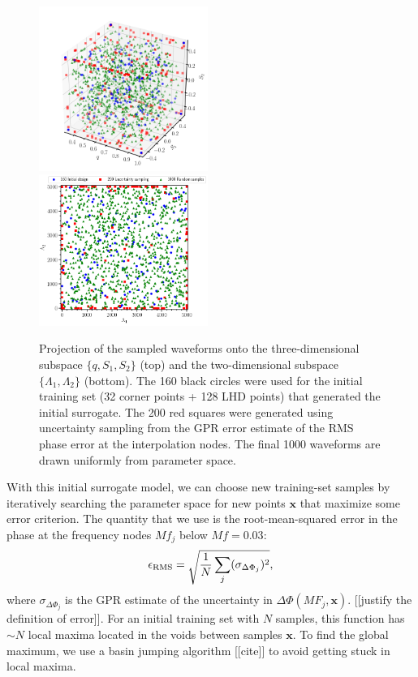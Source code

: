 \documentclass[prd,aps,letter,twocolumn,floatfix,notitlepage,nofootinbib]{revtex4-1}
\def\bx{\mathbf{x}}
\begin{document}
\begin{figure}[htb]
\centering
\includegraphics[width=0.49\textwidth]{trainingset3d.png}\\
\includegraphics[width=0.49\textwidth]{trainingset2d.png}
\caption{Projection of the sampled waveforms onto the three-dimensional subspace $\{q, S_1, S_2\}$ (top) and the two-dimensional subspace $\{\Lambda_1, \Lambda_2\}$ (bottom). The 160 black circles were used for the initial training set (32 corner points + 128 LHD points) that generated the initial surrogate. The 200 red squares were generated using uncertainty sampling from the GPR error estimate of the RMS phase error at the interpolation nodes. The final 1000 waveforms are drawn uniformly from parameter space.
}
\label{fig:LHD}
\end{figure}

With this initial surrogate model, we can choose new training-set samples by iteratively searching the parameter space for new points ${\bm x}$ that maximize some error criterion. The quantity that we use is the root-mean-squared error in the phase at the frequency nodes $Mf_j$ below $Mf=0.03$:
\begin{equation}
\epsilon_{\rm RMS} = \sqrt{\frac{1}{N} \sum_j (\sigma_{\Delta\Phi_j})^2},
\label{eq:errorrms}
\end{equation}
where $\sigma_{\Delta\Phi_j}$ is the GPR estimate of the uncertainty in $\Delta\Phi(MF_j, \bx)$. [[justify the definition of error]]. For an initial training set with $N$ samples, this function has $\sim N$ local maxima located in the voids between samples $\bx$. To find the global maximum, we use a basin jumping algorithm [[cite]] to avoid getting stuck in local maxima.
\end{document}
